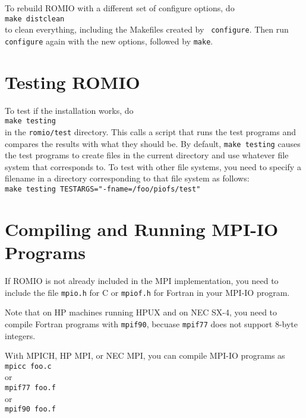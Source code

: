 To rebuild ROMIO with a different set of configure options, do\\
\hspace*{.4in} {\tt make distclean}\\
to clean everything, including the Makefiles created by {\tt
configure}.  Then run {\tt configure} again with the new options,
followed by {\tt make}.


%
%
\section{Testing ROMIO}
To test if the installation works, do\\
\hspace*{.4in} {\tt make testing}\\
in the {\tt romio/test} directory. This calls a script that runs the test
programs and compares the results with what they should be. By
default, {\tt make testing} causes the test programs to create files in
the current directory and use whatever file system that corresponds
to. To test with other file systems, you need to specify a filename in
a directory corresponding to that file system as follows:\\
\hspace*{.4in} {\tt make testing TESTARGS="-fname=/foo/piofs/test"}


%
%
\section{Compiling and Running MPI-IO Programs}
If ROMIO is not already included in the MPI implementation, you need
to include the file {\tt mpio.h} for C or {\tt mpiof.h} for Fortran in
your MPI-IO program.  

Note that on HP machines running HPUX and on NEC SX-4, you need to
compile Fortran programs with {\tt mpif90}, becuase {\tt mpif77} does
not support 8-byte integers. 

With MPICH, HP MPI, or NEC MPI, you can compile MPI-IO programs as \\
\hspace*{.4in} {\tt mpicc foo.c}\\
or \\
\hspace*{.4in} {\tt mpif77 foo.f }\\
or\\
\hspace*{.4in} {\tt mpif90 foo.f}\\

